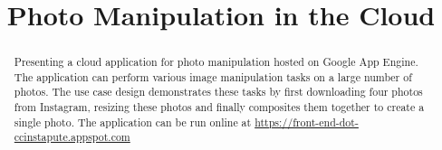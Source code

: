 \documentclass[conference]{IEEEtran}
\begin{document}
\title{Photo Manipulation in the Cloud}


\author{
}


\maketitle


\begin{abstract}
Presenting a cloud application for photo manipulation hosted on Google App Engine. The application can perform various image manipulation tasks on a large number of photos. The use case design demonstrates these tasks by first downloading four photos from Instagram, resizing these photos and finally composites them together to create a single photo. The application can be run online at \url{https://front-end-dot-ccinstapute.appspot.com}
\end{abstract}
\end{document}
